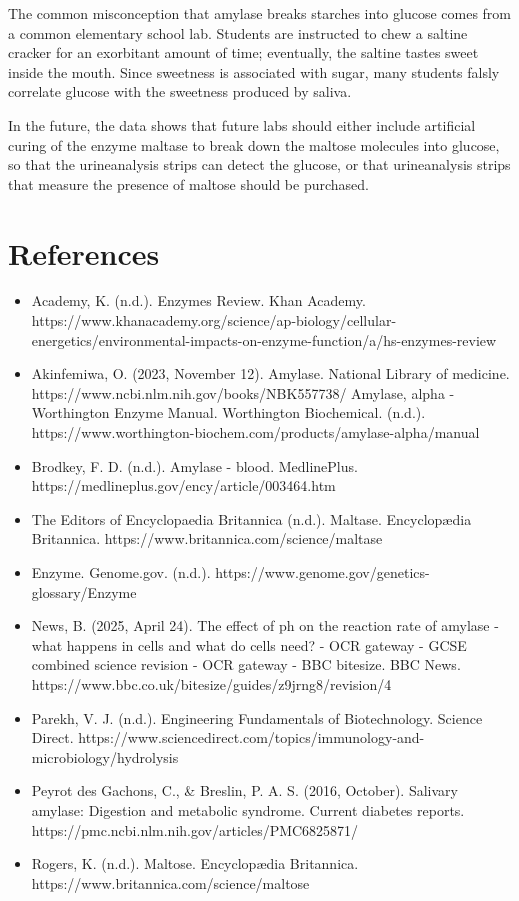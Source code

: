 \documentclass[letterpaper]{article}
\def\tightlist{}
\begin{document}
\begin{doublespace}
The common misconception that amylase breaks starches into glucose comes from a common elementary school lab. Students are instructed to chew a saltine cracker for an exorbitant amount of time; eventually, the saltine tastes sweet inside the mouth. Since sweetness is associated with sugar, many students falsly correlate glucose with the sweetness produced by saliva.

In the future, the data shows that future labs should either include artificial curing of the enzyme maltase to break down the maltose molecules into glucose, so that the urineanalysis strips can detect the glucose, or that urineanalysis strips that measure the presence of maltose should be purchased.

\section{\texorpdfstring{\textbf{References}}{References}}\label{references}

\begin{itemize}
\tightlist
\item
  Academy, K. (n.d.). Enzymes Review. Khan Academy. https://www.khanacademy.org/science/ap-biology/cellular-energetics/environmental-impacts-on-enzyme-function/a/hs-enzymes-review
\item
  Akinfemiwa, O. (2023, November 12). Amylase. National Library of medicine. https://www.ncbi.nlm.nih.gov/books/NBK557738/
  Amylase, alpha - Worthington Enzyme Manual. Worthington Biochemical. (n.d.). https://www.worthington-biochem.com/products/amylase-alpha/manual
\item
  Brodkey, F. D. (n.d.). Amylase - blood. MedlinePlus. https://medlineplus.gov/ency/article/003464.htm
\item
  The Editors of Encyclopaedia Britannica (n.d.). Maltase. Encyclopædia Britannica. https://www.britannica.com/science/maltase
\item
  Enzyme. Genome.gov. (n.d.). https://www.genome.gov/genetics-glossary/Enzyme
\item
  News, B. (2025, April 24). The effect of ph on the reaction rate of amylase - what happens in cells and what do cells need? - OCR gateway - GCSE combined science revision - OCR gateway - BBC bitesize. BBC News. https://www.bbc.co.uk/bitesize/guides/z9jrng8/revision/4
\item
  Parekh, V. J. (n.d.). Engineering Fundamentals of Biotechnology. Science Direct. https://www.sciencedirect.com/topics/immunology-and-microbiology/hydrolysis
\item
  Peyrot des Gachons, C., \& Breslin, P. A. S. (2016, October). Salivary amylase: Digestion and metabolic syndrome. Current diabetes reports. https://pmc.ncbi.nlm.nih.gov/articles/PMC6825871/
\item
  Rogers, K. (n.d.). Maltose. Encyclopædia Britannica. https://www.britannica.com/science/maltose
\end{itemize}

\end{doublespace}
\end{document}
